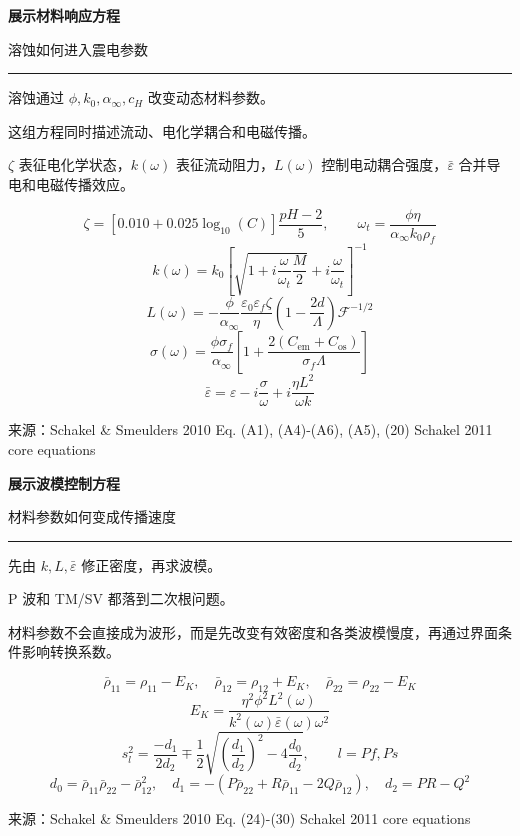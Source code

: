 \documentclass[12pt]{article}
\newcounter{slide}
\newcommand{\TitleFont}{\fontsize{32}{38}\selectfont\bfseries}
\newcommand{\TagFont}{\fontsize{16}{20}\selectfont}
\newcommand{\BodyFont}{\fontsize{18}{24}\selectfont}
\newcommand{\SmallFont}{\fontsize{16}{21}\selectfont}
\newcommand{\FootFont}{\fontsize{12}{14}\selectfont}
\newcommand{\FormulaFont}{\fontsize{18}{23}\selectfont}
\newcommand{\src}[1]{\vfill{\SmallFont\color{Grey}来源：#1}}
\newcommand{\one}[1]{{\BodyFont\color{Ink}#1}}
\newcommand{\explain}[1]{{\SmallFont\color{Grey}#1}}
\newenvironment{slide}[2]{%
  \clearpage
  \stepcounter{slide}
  \thispagestyle{empty}
  {\TitleFont\color{Ink}#1}\par
  \vspace{0.05in}
  {\TagFont\color{Blue}#2}\par
  \vspace{0.11in}
  {\color{Blue}\rule{\textwidth}{1.6pt}}\par
  \vspace{0.22in}
}{%
  \vfill
  {\FootFont\color{Grey}Schakel 2011 core equations}
  \hfill
  {\FootFont\color{Grey}\theslide}
}
\newcommand{\twocol}[2]{%
  \begin{minipage}[t]{0.32\textwidth}
  #1
  \end{minipage}\hfill
  \begin{minipage}[t]{0.63\textwidth}
  #2
  \end{minipage}
}
\begin{document}
\begin{slide}{展示材料响应方程}{溶蚀如何进入震电参数}
\twocol{
\one{溶蚀通过 $\phi,k_0,\alpha_\infty,c_H$ 改变动态材料参数。}\par
\vspace{0.20in}
\one{这组方程同时描述流动、电化学耦合和电磁传播。}\par
\vspace{0.20in}
\explain{$\zeta$ 表征电化学状态，$k(\omega)$ 表征流动阻力，$L(\omega)$ 控制电动耦合强度，$\bar{\varepsilon}$ 合并导电和电磁传播效应。}
}{
{\FormulaFont
\[
\zeta=
\left[0.010+0.025\log_{10}(C)\right]\frac{pH-2}{5},
\qquad
\omega_t=\frac{\phi\eta}{\alpha_\infty k_0\rho_f}
\]
\[
k(\omega)=
k_0
\left[
\sqrt{1+i\frac{\omega}{\omega_t}\frac{M}{2}}
+i\frac{\omega}{\omega_t}
\right]^{-1}
\]
\[
L(\omega)=
-
\frac{\phi}{\alpha_\infty}
\frac{\varepsilon_0\varepsilon_f\zeta}{\eta}
\left(1-\frac{2d}{\Lambda}\right)\mathcal{F}^{-1/2}
\]
\[
\sigma(\omega)=
\frac{\phi\sigma_f}{\alpha_\infty}
\left[
1+\frac{2(C_{\mathrm{em}}+C_{\mathrm{os}})}
{\sigma_f\Lambda}
\right]
\]
\[
\bar{\varepsilon}=
\varepsilon-i\frac{\sigma}{\omega}
+i\frac{\eta L^2}{\omega k}
\]
}
}
\src{Schakel \& Smeulders 2010 Eq. (A1), (A4)-(A6), (A5), (20)}
\end{slide}

\begin{slide}{展示波模控制方程}{材料参数如何变成传播速度}
\twocol{
\one{先由 $k,L,\bar{\varepsilon}$ 修正密度，再求波模。}\par
\vspace{0.20in}
\one{P 波和 TM/SV 都落到二次根问题。}\par
\vspace{0.20in}
\explain{材料参数不会直接成为波形，而是先改变有效密度和各类波模慢度，再通过界面条件影响转换系数。}
}{
{\FormulaFont
\[
\bar{\rho}_{11}=\rho_{11}-E_K,\quad
\bar{\rho}_{12}=\rho_{12}+E_K,\quad
\bar{\rho}_{22}=\rho_{22}-E_K
\]
\[
E_K=
\frac{\eta^2\phi^2L^2(\omega)}
{k^2(\omega)\bar{\varepsilon}(\omega)\omega^2}
\]
\[
s_l^2=
\frac{-d_1}{2d_2}
\mp
\frac{1}{2}
\sqrt{
\left(\frac{d_1}{d_2}\right)^2
-4\frac{d_0}{d_2}
},
\qquad
l=Pf,Ps
\]
\[
d_0=\bar{\rho}_{11}\bar{\rho}_{22}-\bar{\rho}_{12}^2,
\quad
d_1=-(P\bar{\rho}_{22}+R\bar{\rho}_{11}-2Q\bar{\rho}_{12}),
\quad
d_2=PR-Q^2
\]
}
}
\src{Schakel \& Smeulders 2010 Eq. (24)-(30)}
\end{slide}
\end{document}
